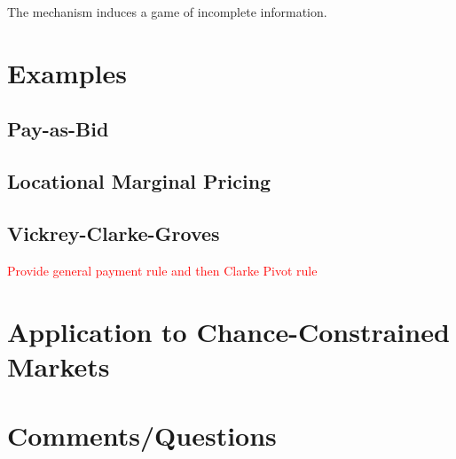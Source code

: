 \documentclass{article}
\begin{document}
The mechanism induces a game of incomplete information.

\section{Examples}

\subsection{Pay-as-Bid}

\subsection{Locational Marginal Pricing}

\subsection{Vickrey-Clarke-Groves}

\textcolor{red}{Provide general payment rule and then Clarke Pivot rule}

\section{Application to Chance-Constrained Markets}

\section{Comments/Questions}
\end{document}

